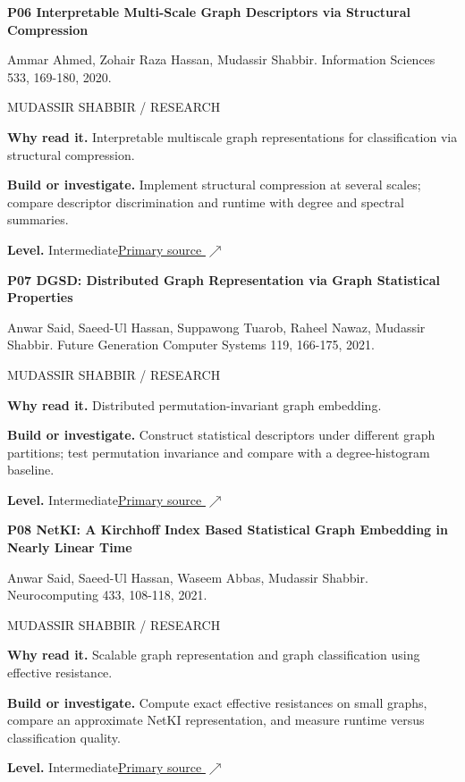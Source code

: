 \documentclass[11pt,letterpaper]{article}
\begin{document}
\begin{minipage}{\linewidth}
{\large\bfseries P06 Interpretable Multi-Scale Graph Descriptors via Structural Compression}\par
Ammar Ahmed, Zohair Raza Hassan, Mudassir Shabbir. Information Sciences 533, 169-180, 2020.\par
\textcolor{ink}{\small MUDASSIR SHABBIR / RESEARCH}\par
\textbf{Why read it.} Interpretable multiscale graph representations for classification via structural compression.\par
\textbf{Build or investigate.} Implement structural compression at several scales; compare descriptor discrimination and runtime with degree and spectral summaries.\par
\textbf{Level.} Intermediate\quad\href{https://doi.org/10.1016/j.ins.2020.05.032}{Primary source $\nearrow$}\par
\end{minipage}\par\vspace{10pt}
\begin{minipage}{\linewidth}
{\large\bfseries P07 DGSD: Distributed Graph Representation via Graph Statistical Properties}\par
Anwar Said, Saeed-Ul Hassan, Suppawong Tuarob, Raheel Nawaz, Mudassir Shabbir. Future Generation Computer Systems 119, 166-175, 2021.\par
\textcolor{ink}{\small MUDASSIR SHABBIR / RESEARCH}\par
\textbf{Why read it.} Distributed permutation-invariant graph embedding.\par
\textbf{Build or investigate.} Construct statistical descriptors under different graph partitions; test permutation invariance and compare with a degree-histogram baseline.\par
\textbf{Level.} Intermediate\quad\href{https://doi.org/10.1016/j.future.2021.02.005}{Primary source $\nearrow$}\par
\end{minipage}\par\vspace{10pt}
\begin{minipage}{\linewidth}
{\large\bfseries P08 NetKI: A Kirchhoff Index Based Statistical Graph Embedding in Nearly Linear Time}\par
Anwar Said, Saeed-Ul Hassan, Waseem Abbas, Mudassir Shabbir. Neurocomputing 433, 108-118, 2021.\par
\textcolor{ink}{\small MUDASSIR SHABBIR / RESEARCH}\par
\textbf{Why read it.} Scalable graph representation and graph classification using effective resistance.\par
\textbf{Build or investigate.} Compute exact effective resistances on small graphs, compare an approximate NetKI representation, and measure runtime versus classification quality.\par
\textbf{Level.} Intermediate\quad\href{https://doi.org/10.1016/j.neucom.2020.12.075}{Primary source $\nearrow$}\par
\end{minipage}\par\vspace{10pt}
\end{document}
